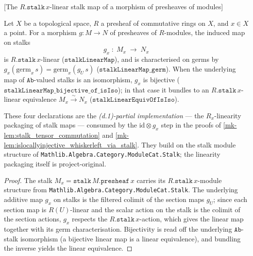 \begin{lemma}

[The $R.\mathtt{stalk}\,x$-linear stalk map of a morphism of presheaves of modules]
  \label{mk-lem:stalk_linear_map}
  \leanok

  Let \(X\) be a topological space, \(R\) a presheaf of commutative rings on
  \(X\), and \(x \in X\) a point. For a morphism \(g : M \to N\) of presheaves of
  \(R\)-modules, the induced map on stalks
  \[
    g_x \;\colon\; M_x \;\longrightarrow\; N_x
  \]
  is \(R.\mathtt{stalk}\,x\)-linear (\(\mathtt{stalkLinearMap}\)), and is
  characterised on germs by
  \(g_x(\mathrm{germ}_x\,s) = \mathrm{germ}_x(g_U\,s)\)
  (\(\mathtt{stalkLinearMap\_germ}\)). When the underlying map of
  \(\mathtt{Ab}\)-valued stalks is an isomorphism, \(g_x\) is bijective
  (\(\mathtt{stalkLinearMap\_bijective\_of\_isIso}\)); in that case it bundles to
  an \(R.\mathtt{stalk}\,x\)-linear equivalence
  \(M_x \xrightarrow{\sim} N_x\) (\(\mathtt{stalkLinearEquivOfIsIso}\)).

  These four declarations are the \emph{(d.1)-partial implementation} --- the
  \(R_x\)-linearity packaging of stalk maps --- consumed by the
  \(\mathrm{id} \otimes g_x\) step in the proofs of
  \ref{mk-lem:stalk_tensor_commutation} and
  \ref{mk-lem:islocallyinjective_whiskerleft_via_stalk}. They build on the
  stalk module structure of \texttt{Mathlib.Algebra.Category.ModuleCat.Stalk};
  the linearity packaging itself is project-original.
\end{lemma}

\begin{proof}
  \leanok
  The stalk \(M_x = \mathtt{stalk}\,M.\mathtt{presheaf}\,x\) carries its
  \(R.\mathtt{stalk}\,x\)-module structure from
  \texttt{Mathlib.Algebra.Category.ModuleCat.Stalk}. The underlying additive map
  \(g_x\) on stalks is the filtered colimit of the section maps \(g_U\); since
  each section map is \(R(U)\)-linear and the scalar action on the stalk is the
  colimit of the section actions, \(g_x\) respects the
  \(R.\mathtt{stalk}\,x\)-action, which gives the linear map together with its
  germ characterisation. Bijectivity is read off the underlying
  \(\mathtt{Ab}\)-stalk isomorphism (a bijective linear map is a linear
  equivalence), and bundling the inverse yields the linear equivalence.
\end{proof}

